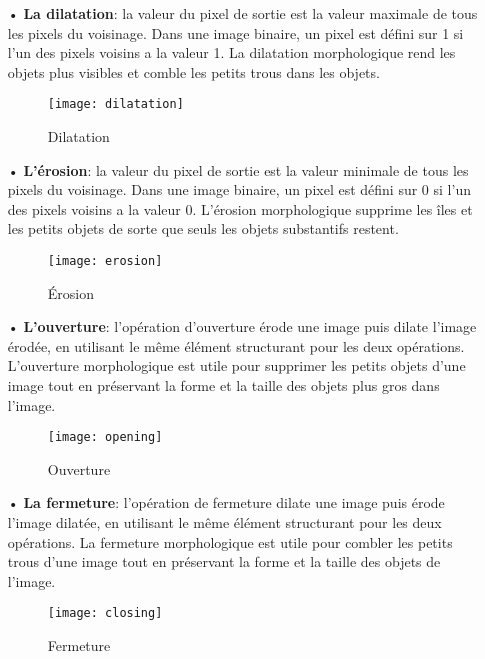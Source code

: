     \begin{itemize}
        \item[•]\textbf{La dilatation}: la valeur du pixel de sortie est la valeur maximale de tous les pixels du voisinage. Dans une image binaire, un pixel est défini sur 1 si l'un des pixels voisins a la valeur 1. La dilatation morphologique rend les objets plus visibles et comble les petits trous dans les objets.
        \begin{figure}[H]
            \centering
            \texttt{[image: dilatation]}
            \caption{Dilatation}
        \end{figure}  
       
        \item[•]\textbf{L'érosion}: la valeur du pixel de sortie est la valeur minimale de tous les pixels du voisinage. Dans une image binaire, un pixel est défini sur 0 si l'un des pixels voisins a la valeur 0. L'érosion morphologique supprime les îles et les petits objets de sorte que seuls les objets substantifs restent. 
        \begin{figure}[H]
            \centering
            \texttt{[image: erosion]}
            \caption{Érosion}
        \end{figure}  
        \item[•]\textbf{L'ouverture}: l'opération d'ouverture érode une image puis dilate l'image érodée, en utilisant le même élément structurant pour les deux opérations. L'ouverture morphologique est utile pour supprimer les petits objets d'une image tout en préservant la forme et la taille des objets plus gros dans l'image. 
            \begin{figure}[H]
                \centering
                \texttt{[image: opening]}
                \caption{Ouverture}
            \end{figure} 
        \item[•]\textbf{La fermeture}: l'opération de fermeture dilate une image puis érode l'image dilatée, en utilisant le même élément structurant pour les deux opérations. La fermeture morphologique est utile pour combler les petits trous d'une image tout en préservant la forme et la taille des objets de l'image.\cite{mathlabMorpho}
        \begin{figure}[H]
            \centering
            \texttt{[image: closing]}
            \caption{Fermeture}
        \end{figure} 
    \end{itemize} 


